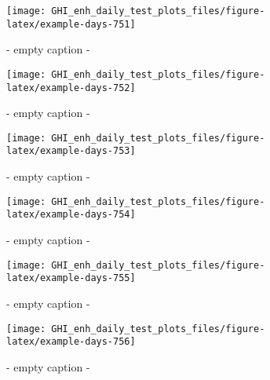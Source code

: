 \documentclass[
  10pt,
  a4paper,oneside]{article}
\begin{document}
\begin{figure}[H]

{\centering \texttt{[image: GHI\_enh\_daily\_test\_plots\_files/figure-latex/example-days-751]} 

}

\caption{ - empty caption - }\label{fig:example-days-751}
\end{figure}

\begin{figure}[H]

{\centering \texttt{[image: GHI\_enh\_daily\_test\_plots\_files/figure-latex/example-days-752]} 

}

\caption{ - empty caption - }\label{fig:example-days-752}
\end{figure}

\begin{figure}[H]

{\centering \texttt{[image: GHI\_enh\_daily\_test\_plots\_files/figure-latex/example-days-753]} 

}

\caption{ - empty caption - }\label{fig:example-days-753}
\end{figure}

\begin{figure}[H]

{\centering \texttt{[image: GHI\_enh\_daily\_test\_plots\_files/figure-latex/example-days-754]} 

}

\caption{ - empty caption - }\label{fig:example-days-754}
\end{figure}

\begin{figure}[H]

{\centering \texttt{[image: GHI\_enh\_daily\_test\_plots\_files/figure-latex/example-days-755]} 

}

\caption{ - empty caption - }\label{fig:example-days-755}
\end{figure}

\begin{figure}[H]

{\centering \texttt{[image: GHI\_enh\_daily\_test\_plots\_files/figure-latex/example-days-756]} 

}

\caption{ - empty caption - }\label{fig:example-days-756}
\end{figure}
\end{document}
